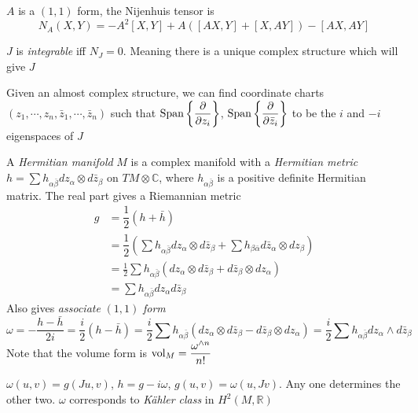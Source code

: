 \documentclass[main]{subfiles}
\begin{document}
\begin{definition}
$A$ is a $(1,1)$ form, the Nijenhuis tensor is
\[N_A(X,Y)=-A^2[X,Y]+A([AX,Y]+[X,AY])-[AX,AY]\]
\end{definition}

\begin{theorem}
$J$ is \textit{integrable} iff $N_J=0$. Meaning there is a unique complex structure which will give $J$
\end{theorem}

\begin{proposition}
Given an almost complex structure, we can find coordinate charts $(z_1,\cdots,z_n,\bar z_1,\cdots,\bar z_n)$ such that $\operatorname{Span}\left\{\dfrac{\partial}{\partial z_i}\right\}$, $\operatorname{Span}\left\{\dfrac{\partial}{\partial \bar z_i}\right\}$ to be the $i$ and $-i$ eigenspaces of $J$
\end{proposition}

\begin{definition}
A \textit{Hermitian manifold} $M$ is a complex manifold with a \textit{Hermitian metric} $h=\sum h_{\alpha\bar\beta}dz_\alpha \otimes d\bar z_\beta$ on $TM\otimes\mathbb C$, where $h_{\alpha\bar\beta}$ is a positive definite Hermitian matrix. The real part gives a Riemannian metric
\begin{align*}
g&=\dfrac{1}{2}(h+\bar h) \\
&=\dfrac{1}{2}\left(\sum h_{\alpha\bar\beta}dz_\alpha \otimes d\bar z_\beta+\sum h_{\beta\bar\alpha}d\bar z_\alpha \otimes dz_\beta\right) \\
&=\frac{1}{2}\sum h_{\alpha\bar\beta}(dz_\alpha \otimes d\bar z_\beta+d\bar z_\beta \otimes dz_\alpha) \\
&=\sum h_{\alpha\bar\beta}dz_\alpha d\bar z_\beta
\end{align*}
Also gives \textit{associate} $(1,1)$ \textit{form}
\[\omega=-\dfrac{h-\bar h}{2i}=\dfrac{i}{2}(h-\bar h)=\dfrac{i}{2}\sum h_{\alpha\bar\beta}(dz_\alpha\otimes d\bar z_\beta-d \bar z_\beta\otimes dz_\alpha)=\frac{i}{2}\sum h_{\alpha\bar\beta}dz_\alpha\wedge d\bar z_\beta\]
Note that the volume form is $\operatorname{vol}_M=\dfrac{\omega^{\wedge n}}{n!}$
\end{definition}

\begin{remark}
$\omega(u,v)=g(Ju,v)$, $h=g-i\omega$, $g(u,v)=\omega(u,Jv)$. Any one determines the other two. $\omega$ corresponds to \textit{K\"ahler class} in $H^2(M,\mathbb R)$
\end{remark}
\end{document}
